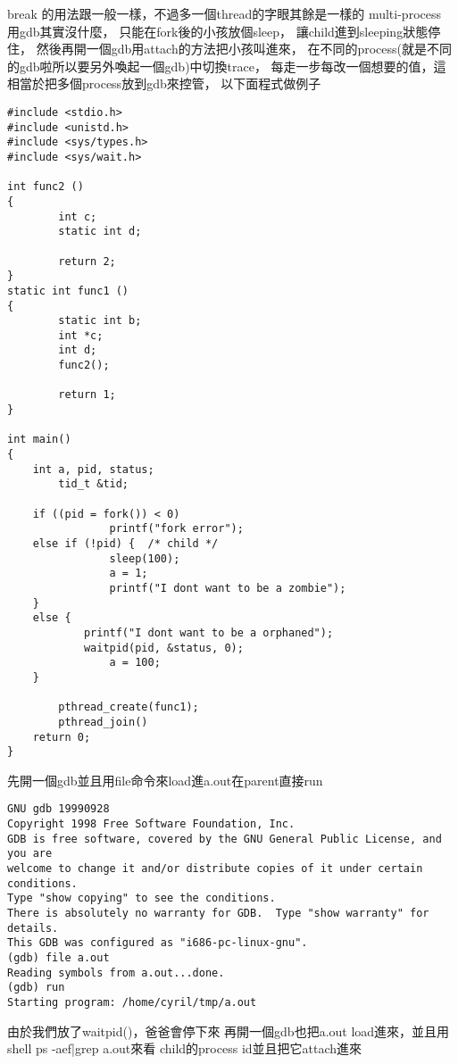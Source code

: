   break 的用法跟一般一樣，不過多一個thread的字眼其餘是一樣的
  multi-process 用gdb其實沒什麼， 只能在fork後的小孩放個sleep，
  讓child進到sleeping狀態停住， 然後再開一個gdb用attach的方法把小孩叫進來，
  在不同的process(就是不同的gdb啦所以要另外喚起一個gdb)中切換trace，
  每走一步每改一個想要的值，這相當於把多個process放到gdb來控管，
  以下面程式做例子
  \begin{verbatim}
#include <stdio.h>
#include <unistd.h>
#include <sys/types.h>
#include <sys/wait.h>

int func2 ()
{
        int c;
        static int d;

        return 2;
}
static int func1 ()
{
        static int b;
        int *c;
        int d;
        func2();

        return 1;
}

int main()
{
	int a, pid, status;
        tid_t &tid;

	if ((pid = fork()) < 0)
                printf("fork error");
	else if (!pid) {  /* child */
                sleep(100);
                a = 1;
                printf("I dont want to be a zombie");
	}
	else {
	        printf("I dont want to be a orphaned");
	        waitpid(pid, &status, 0);
                a = 100;
	}

        pthread_create(func1);
        pthread_join()
	return 0;
}
  \end{verbatim}
  先開一個gdb並且用file命令來load進a.out在parent直接run
  \begin{verbatim}
GNU gdb 19990928
Copyright 1998 Free Software Foundation, Inc.
GDB is free software, covered by the GNU General Public License, and you are
welcome to change it and/or distribute copies of it under certain conditions.
Type "show copying" to see the conditions.
There is absolutely no warranty for GDB.  Type "show warranty" for details.
This GDB was configured as "i686-pc-linux-gnu".
(gdb) file a.out
Reading symbols from a.out...done.
(gdb) run
Starting program: /home/cyril/tmp/a.out
  \end{verbatim}
  由於我們放了waitpid()，爸爸會停下來
  再開一個gdb也把a.out load進來，並且用shell ps -aef|grep a.out來看
  child的process id並且把它attach進來
